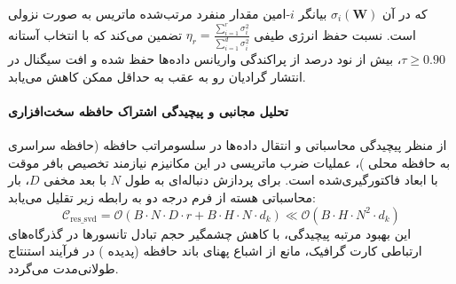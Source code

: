 
که در آن $\sigma_i(\mathbf{W})$ بیانگر $i$-امین مقدار منفرد مرتب‌شده ماتریس به صورت نزولی است. نسبت حفظ انرژی طیفی $\eta_r = \frac{\sum_{i=1}^r \sigma_i^2}{\sum_{i=1}^{d} \sigma_i^2}$ تضمین می‌کند که با انتخاب آستانه $\tau \ge 0.90$، بیش از نود درصد از پراکندگی واریانس داده‌ها حفظ شده و افت سیگنال در انتشار گرادیان رو به عقب به حداقل ممکن کاهش می‌یابد.

\paragraph{تحلیل مجانبی و پیچیدگی اشتراک حافظه سخت‌افزاری}
از منظر پیچیدگی محاسباتی و انتقال داده‌ها در سلسومراتب حافظه (حافظه سراسری  به حافظه محلی )، عملیات ضرب ماتریسی در این مکانیزم نیازمند تخصیص بافر موقت با ابعاد فاکتورگیری‌شده است. برای پردازش دنباله‌ای به طول $N$ با بعد مخفی $D$، بار محاسباتی هسته از فرم درجه دو به رابطه زیر تقلیل می‌یابد:
\begin{equation}
\label{eq:complexity_res_svd}
\mathcal{C}_{\text{res\_svd}} = \mathcal{O}\left( B \cdot N \cdot D \cdot r + B \cdot H \cdot N \cdot d_k \right) \ll \mathcal{O}\left( B \cdot H \cdot N^2 \cdot d_k \right)
\end{equation}
این بهبود مرتبه پیچیدگی، با کاهش چشمگیر حجم تبادل تانسورها در گذرگاه‌های ارتباطی کارت گرافیک، مانع از اشباع پهنای باند حافظه (پدیده ) در فرآیند استنتاج طولانی‌مدت می‌گردد.